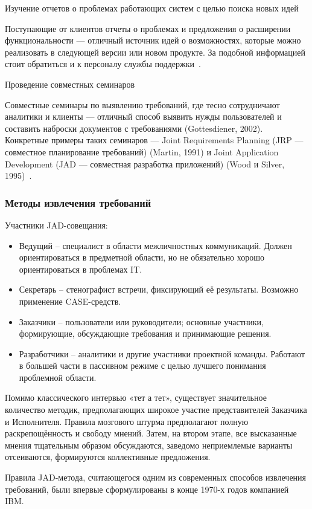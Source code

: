 \documentclass{../industrial-development}
\begin{document}
\alert{Изучение отчетов о проблемах работающих систем с целью поиска новых идей}

Поступающие от клиентов отчеты о проблемах и предложения о расширении функциональности — отличный источник идей о возможностях, которые можно реализовать в следующей версии или новом продукте. За подобной информацией стоит обратиться и к персоналу службы поддержки~\cite[с.~48]{Wiegers}.

\alert{Проведение совместных семинаров}

Совместные семинары по выявлению требований, где тесно сотрудничают аналитики и клиенты — отличный способ выявить нужды пользователей и составить наброски документов с требованиями (Gottesdiener, 2002). Конкретные примеры таких семинаров — Joint Requirements Planning (JRP — совместное планирование требований) (Martin, 1991) и Joint Application Development (JAD — совместная разработка приложений) (Wood и Silver, 1995)~\cite[с.~47]{Wiegers}.


\begin{frame} \frametitle{Методы извлечения требований}
Участники JAD-совещания:
  \begin{itemize} 
\item \alert{Ведущий} – специалист в области межличностных коммуникаций. Должен
ориентироваться в предметной области, но не обязательно хорошо ориентироваться в
проблемах IT.
\item \alert{Секретарь} – стенографист встречи, фиксирующий её результаты. Возможно применение CASE-средств.
\item \alert{Заказчики} – пользователи или руководители; основные участники, формирующие,
обсуждающие требования и принимающие решения.
\item \alert{Разработчики} – аналитики и другие участники проектной команды. Работают в
большей части в пассивном режиме с целью лучшего понимания проблемной области.
\end{itemize}
\end{frame}

\lecturenotes

Помимо классического интервью «тет а тет», существует значительное количество методик, предполагающих широкое участие представителей Заказчика и Исполнителя.
Правила мозгового штурма предполагают полную раскрепощённость и свободу мнений. 
Затем, на втором этапе, все высказанные мнения тщательным образом обсуждаются, заведомо неприемлемые варианты отсеиваются, формируются
коллективные предложения.

Правила JAD-метода, считающегося одним из современных способов извлечения
требований, были впервые сформулированы в конце 1970-х годов компанией IBM.
\end{document}
